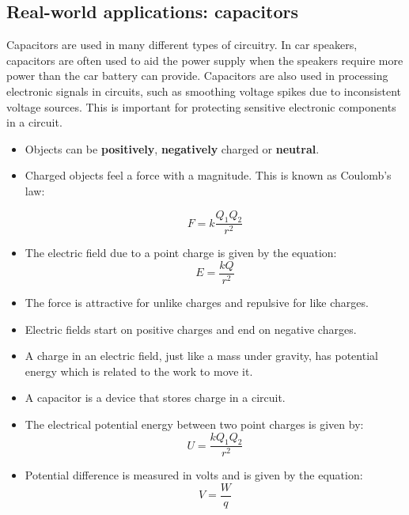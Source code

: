 \subsection{Real-world applications: capacitors}
Capacitors are used in many different types of circuitry.  In car
speakers, capacitors are often used to aid the power supply when
the speakers require more power than the car battery can provide.
Capacitors are also used in processing electronic signals in
circuits, such as smoothing voltage spikes due to inconsistent
voltage sources. This is important for protecting sensitive electronic components in a circuit.

\begin{itemize}
\item Objects can be \textbf{positively}, \textbf{negatively} charged or \textbf{neutral}.
\item Charged objects feel a force with a magnitude. This is known as Coulomb's law:

\begin{equation*}
F = k \frac{Q_1Q_2}{r^2}
\end{equation*}

\item The electric field due to a point charge is given by the equation:
\begin{equation*}
E = \frac{kQ}{r^2}
\end{equation*}

\item The force is attractive for unlike charges and repulsive for
like charges.

\item Electric fields start on positive charges and end on negative
charges.

\item A charge in an electric field, just like a mass under gravity,
has potential energy which is related to the work to move it.
\item A capacitor is a device that stores charge in a circuit.

\item The electrical potential energy between two point charges is given by:
\begin{equation*}
U = \frac{kQ_{1}Q_{2}}{r^2}
\end{equation*}

\item Potential difference is measured in volts and is given by the equation:
\begin{equation*}
V = \frac{W}{q}
\end{equation*}


\end{itemize}
